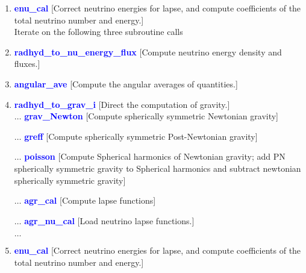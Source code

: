 \documentclass[11pt,doublespace]{article}
\begin{document}
\begin{itemize}
\begin{enumerate}
\begin{enumerate}
\begin{enumerate}
{\begin{enumerate}
  \item \textcolor{blue}{ {\bf enu\_cal} }
  [Correct neutrino energies for lapse, and compute coefficients of the total neutrino number and energy.]\\
  
  Iterate on the following three subroutine calls

  \item \textcolor{blue}{ {\bf radhyd\_to\_nu\_energy\_flux} }
  [Compute neutrino energy density and fluxes.]

  \item \textcolor{blue}{ {\bf angular\_ave} }
  [Compute the angular averages of quantities.]

  \item \textcolor{blue}{ {\bf radhyd\_to\_grav\_i} }
  [Direct the computation of gravity.]\\
  
  $\ldots$ \textcolor{blue}{ {\bf grav\_Newton} }
  [Compute spherically symmetric Newtonian gravity]
  
  $\ldots$ \textcolor{blue}{ {\bf greff} }
  [Compute spherically symmetric Post-Newtonian gravity]
 
  $\ldots$ \textcolor{blue}{ {\bf poisson} }
  [Compute Spherical harmonics of Newtonian gravity; add PN spherically symmetric gravity to Spherical harmonics and subtract newtonian spherically symmetric gravity]
 
  $\ldots$ \textcolor{blue}{ {\bf agr\_cal} }
  [Compute lapse functions]
   
  $\ldots$ \textcolor{blue}{ {\bf agr\_nu\_cal} }
  [Load neutrino lapse functions.]

  $\ldots$ \item \textcolor{blue}{ {\bf enu\_cal} }
  [Correct neutrino energies for lapse, and compute coefficients of the total neutrino number and energy.]

\end{enumerate}

}
    
\end{enumerate}
\end{enumerate}
\end{enumerate}
\end{itemize}
\end{document}
